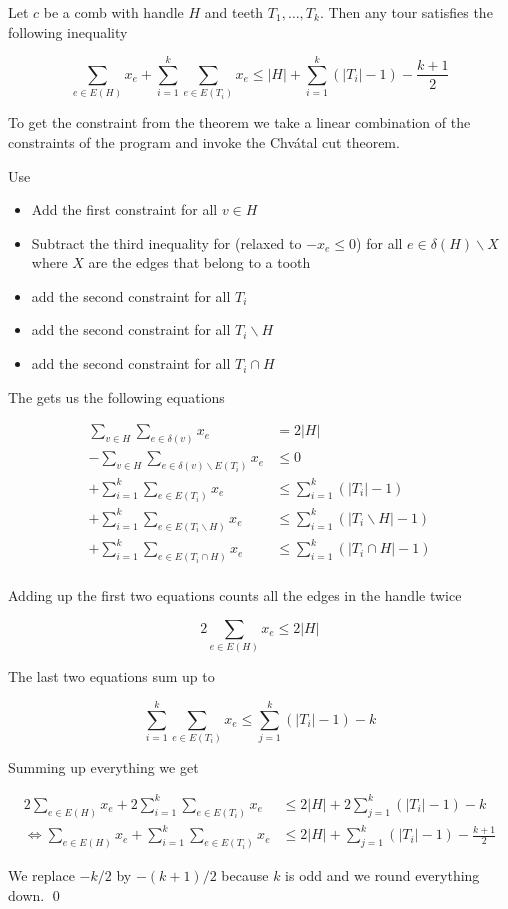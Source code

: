 
\begin{thm} Let $c$ be a comb with handle $H$ and teeth $T_1,\ldots, T_k$. Then any tour satisfies the following inequality

\[\sum_{e\in E(H)} x_e +\sum_{i=1}^k\sum_{e\in E(T_i)} x_e \leq |H|+\sum_{i=1}^k(|T_i|-1)-\frac{k+1}{2}\]
\end{thm}

\begin{pr} To get the constraint from the theorem we take a linear combination of the constraints of the program and invoke the Chv\'{a}tal cut theorem.

Use

\begin{itemize}
\item Add the first constraint for all $v\in H$
\item Subtract the third inequality for (relaxed to $-x_e\leq 0$) for all $e\in \delta(H)\backslash X$ where $X$ are the edges that belong to a tooth
\item add the second constraint for all $T_i$
\item add the second constraint for all $T_i\backslash H$
\item add the second constraint for all $T_i \cap H$
\end{itemize}

The gets us the following equations

\begin{align*}
\sum_{v\in H}\sum_{e\in \delta(v)} x_e&=2|H|\\
-\sum_{v\in H} \sum_{e\in \delta(v) \backslash E(T_i)} x_e & \leq 0\\
+\sum_{i=1}^k \sum_{e\in E(T_i)} x_e &\leq \sum_{i=1}^k(|T_i|-1)\\
+\sum_{i=1}^k \sum_{e\in E(T_i\backslash H)} x_e &\leq \sum_{i=1}^k(|T_i\backslash H|-1)\\
+\sum_{i=1}^k \sum_{e\in E(T_i\cap H)} x_e &\leq \sum_{i=1}^k(|T_i\cap H|-1)\\
\end{align*}

Adding up the first two equations counts all the edges in the handle twice

\[2\sum_{e\in E(H)} x_e \leq 2|H|\]

The last two equations sum up to

\[\sum_{i=1}^k \sum_{e\in E(T_i)} x_e \leq \sum_{j=1}^k (|T_i|-1) -k\]

Summing up everything we get

\begin{align*}
2\sum_{e\in E(H)} x_e + 2\sum_{i=1}^k \sum_{e\in E(T_i)} x_e &\leq 2|H| + 2\sum_{j=1}^k (|T_i|-1) -k\\
\Leftrightarrow \sum_{e\in E(H)} x_e + \sum_{i=1}^k \sum_{e\in E(T_i)} x_e &\leq 2|H| + \sum_{j=1}^k (|T_i|-1) -\frac{k+1}{2}
\end{align*}

We replace $-k/2$ by $-(k+1)/2$ because $k$ is odd and we round everything down.
\qed \end{pr}

